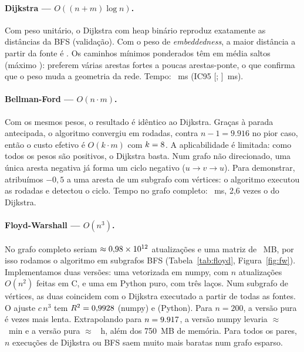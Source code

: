 \IfFileExists{webmedia.cls}{\documentclass[sigconf]{webmedia}}{\documentclass[sigconf]{acmart}}
\begin{document}
\paragraph{Dijkstra --- $O((n+m)\log n)$.} Com peso unitário, o Dijkstra com heap binário reproduz exatamente as distâncias da BFS (validação). Com o peso de \emph{embeddedness}, a maior distância a partir da fonte é \dijDistMax. Os caminhos mínimos ponderados têm em média \dijSaltosMedios{} saltos (máximo \dijSaltosMax): preferem várias arestas fortes a poucas arestas-ponte, o que confirma que o peso muda a geometria da rede. Tempo: \tDijkstraMed~ms (IC95 [\tDijkstraInf; \tDijkstraSup]~ms).

\paragraph{Bellman-Ford --- $O(n \cdot m)$.} Com os mesmos pesos, o resultado é idêntico ao Dijkstra. Graças à parada antecipada, o algoritmo convergiu em \bfRodadas{} rodadas, contra $n - 1 = 9.916$ no pior caso, então o custo efetivo é $O(k \cdot m)$ com $k = 8$. A aplicabilidade é limitada: como todos os pesos são positivos, o Dijkstra basta. Num grafo não direcionado, uma única aresta negativa já forma um ciclo negativo ($u \to v \to u$). Para demonstrar, atribuímos $-0{,}5$ a uma aresta de um subgrafo com \bfNegN{} vértices: o algoritmo executou as \bfNegRodadas{} rodadas e detectou o ciclo. Tempo no grafo completo: \tBellmanFordMed~ms, 2,6 vezes o do Dijkstra.

\paragraph{Floyd-Warshall --- $O(n^3)$.}\label{sec:fw} No grafo completo seriam $\approx 0{,}98 \times 10^{12}$ atualizações e uma matriz de \fwMemoriaMB~MB, por isso rodamos o algoritmo em subgrafos BFS (Tabela~\ref{tab:floyd}, Figura~\ref{fig:fw}). Implementamos duas versões: uma vetorizada em numpy, com $n$ atualizações $O(n^2)$ feitas em C, e uma em Python puro, com três laços. Num subgrafo de \fwValN{} vértices, as duas coincidem com o Dijkstra executado a partir de todas as fontes. O ajuste $c\,n^3$ tem $R^2 = 0{,}9928$ (numpy) e \fwRdoisPython{} (Python). Para $n = 200$, a versão pura é \fwRazao{} vezes mais lenta. Extrapolando para $n = 9.917$, a versão numpy levaria $\approx$ \fwEstNumpyMin~min e a versão pura $\approx$ \fwEstPythonH~h, além dos 750~MB de memória. Para todos os pares, $n$ execuções de Dijkstra ou BFS saem muito mais baratas num grafo esparso.
\end{document}
